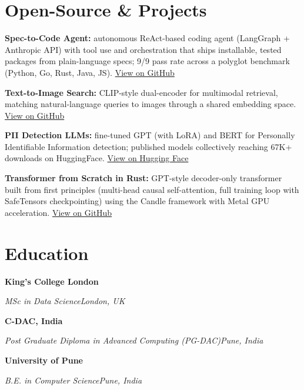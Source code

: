 \documentclass[10pt,a4paper]{article}
\newcommand{\entry}[4]{%
  {\color{company}\bfseries #1}\hfill {\color{muted}#2}\par
  \vspace{1pt}
  {\itshape #3}\hfill {\color{muted}\itshape #4}\par
  \vspace{3pt}%
}
\begin{document}
\section{Open-Source \& Projects}
\begin{tight}
  \item \textbf{Spec-to-Code Agent:} autonomous ReAct-based coding agent (LangGraph + Anthropic API) with tool use and orchestration that ships installable, tested packages from plain-language specs; 9/9 pass rate across a polyglot benchmark (Python, Go, Rust, Java, JS). \href{https://github.com/abhijeetscode/Spec-to-Code-Agent}{View on GitHub}
  \item \textbf{Text-to-Image Search:} CLIP-style dual-encoder for multimodal retrieval, matching natural-language queries to images through a shared embedding space. \href{https://github.com/abhijeetscode/text-to-image-search}{View on GitHub}
  \item \textbf{PII Detection LLMs:} fine-tuned GPT (with LoRA) and BERT for Personally Identifiable Information detection; published models collectively reaching 67K+ downloads on HuggingFace. \href{https://huggingface.co/ab-ai/pii_model}{View on Hugging Face}
  \item \textbf{Transformer from Scratch in Rust:} GPT-style decoder-only transformer built from first principles (multi-head causal self-attention, full training loop with SafeTensors checkpointing) using the Candle framework with Metal GPU acceleration. \href{https://github.com/abhijeetscode/transformer-rust}{View on GitHub}
\end{tight}

\section{Education}
\entry{King's College London}{}{MSc in Data Science}{London, UK}
\vspace{-3pt}
\entry{C-DAC, India}{}{Post Graduate Diploma in Advanced Computing (PG-DAC)}{Pune, India}
\vspace{-3pt}
\entry{University of Pune}{}{B.E. in Computer Science}{Pune, India}
\end{document}
